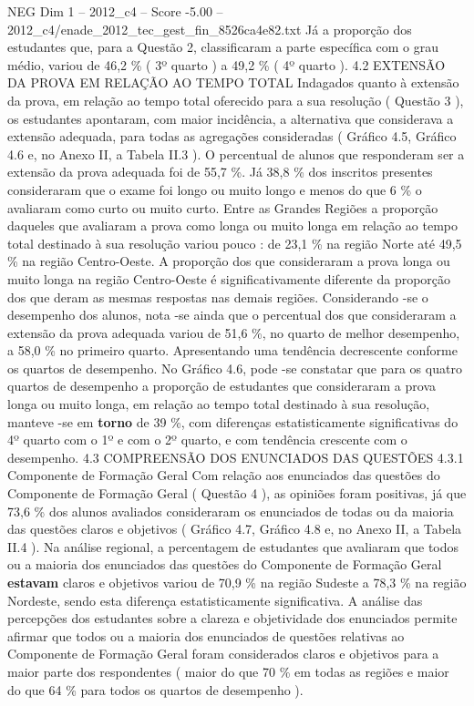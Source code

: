 \begin{textsample}{NEG Dim 1 – 2012\_c4 – Score -5.00 – 2012\_c4/enade\_2012\_tec\_gest\_fin\_8526ca4e82.txt}
Já a proporção dos estudantes que, para a Questão 2, classificaram a parte específica com o grau médio, variou de 46,2 \% ( 3º quarto ) a 49,2 \% ( 4º quarto ). 4.2 EXTENSÃO DA PROVA EM RELAÇÃO AO TEMPO TOTAL Indagados quanto à extensão da prova, em relação ao tempo total oferecido para a sua resolução ( Questão 3 ), os estudantes apontaram, com maior incidência, a alternativa que considerava a extensão adequada, para todas as agregações consideradas ( Gráfico 4.5, Gráfico 4.6 e, no Anexo II, a Tabela II.3 ).
O percentual de alunos que responderam ser a extensão da prova adequada foi de 55,7 \%.
Já 38,8 \% dos inscritos presentes consideraram que o exame foi longo ou muito longo e menos do que 6 \% o avaliaram como curto ou muito curto.
Entre as Grandes Regiões a proporção daqueles que avaliaram a prova como longa ou muito longa em relação ao tempo total destinado à sua resolução variou pouco : de 23,1 \% na região Norte até 49,5 \% na região Centro-Oeste.
A proporção dos que consideraram a prova longa ou muito longa na região Centro-Oeste é significativamente diferente da proporção dos que deram as mesmas respostas nas demais regiões.
Considerando -se o desempenho dos alunos, nota -se ainda que o percentual dos que consideraram a extensão da prova adequada variou de 51,6 \%, no quarto de melhor desempenho, a 58,0 \% no primeiro quarto.
Apresentando uma tendência decrescente conforme os quartos de desempenho.
No Gráfico 4.6, pode -se constatar que para os quatro quartos de desempenho a proporção de estudantes que consideraram a prova longa ou muito longa, em relação ao tempo total destinado à sua resolução, manteve -se em \textbf{torno} de 39 \%, com diferenças estatisticamente significativas do 4º quarto com o 1º e com o 2º quarto, e com tendência crescente com o desempenho. 4.3 COMPREENSÃO DOS ENUNCIADOS DAS QUESTÕES 4.3.1 Componente de Formação Geral Com relação aos enunciados das questões do Componente de Formação Geral ( Questão 4 ), as opiniões foram positivas, já que 73,6 \% dos alunos avaliados consideraram os enunciados de todas ou da maioria das questões claros e objetivos ( Gráfico 4.7, Gráfico 4.8 e, no Anexo II, a Tabela II.4 ).
Na análise regional, a percentagem de estudantes que avaliaram que todos ou a maioria dos enunciados das questões do Componente de Formação Geral \textbf{estavam} claros e objetivos variou de 70,9 \% na região Sudeste a 78,3 \% na região Nordeste, sendo esta diferença estatisticamente significativa.
A análise das percepções dos estudantes sobre a clareza e objetividade dos enunciados permite afirmar que todos ou a maioria dos enunciados de questões relativas ao Componente de Formação Geral foram considerados claros e objetivos para a maior parte dos respondentes ( maior do que 70 \% em todas as regiões e maior do que 64 \% para todos os quartos de desempenho ).

\end{textsample}
